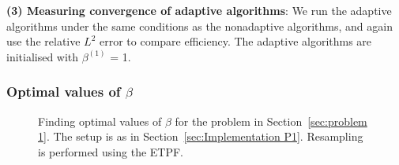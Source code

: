 \documentclass[final]{siamltex}
\begin{document}
{\bf (3) Measuring convergence of adaptive algorithms}: We run the
adaptive algorithms under the same conditions as the nonadaptive
algorithms, and again use the relative $L^2$ error to compare
efficiency. The adaptive algorithms are initialised with $\beta^{(1)}$ = 1.


\subsubsection{Optimal values of $\beta$}\label{sec:Optimal values P1}

\begin{figure}[htb]
\centering
{}
\caption{Finding optimal values of $\beta$ for the problem in Section~\ref{sec:problem 1}. The setup is as in Section~\ref{sec:Implementation P1}. Resampling is performed using the ETPF.}
\label{fig:P1 opt beta}
\end{figure}
\end{document}
